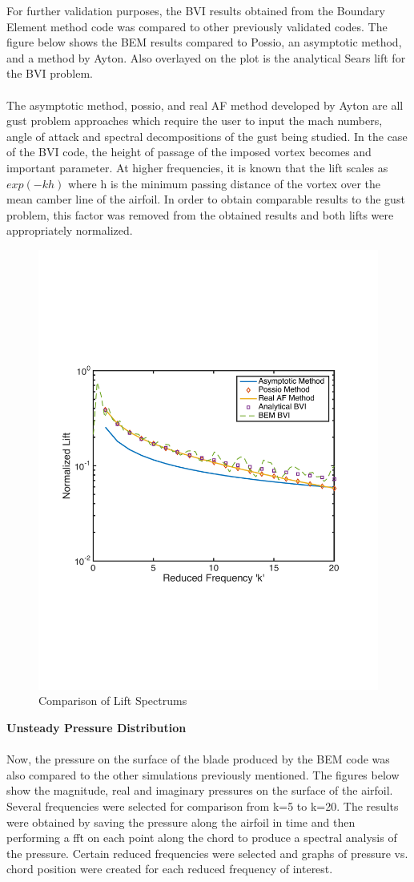 \documentclass{article}
\begin{document}
\noindent For further validation purposes, the BVI results obtained from the Boundary Element method code was compared to other previously validated codes. The figure below shows the BEM results compared to Possio, an asymptotic method, and a method by Ayton. Also overlayed on the plot is the analytical Sears lift for the BVI problem. \\ \\
The asymptotic method, possio, and real AF method developed by Ayton are all gust problem approaches which require the user to input the mach numbers, angle of attack and spectral decompositions of the gust being studied. In the case of the BVI code, the height of passage of the imposed vortex becomes and important parameter. At higher frequencies, it is known that the lift scales as $exp(-kh)$ where h is the minimum passing distance of the vortex over the mean camber line of the airfoil. In order to obtain comparable results to the gust problem, this factor was removed from the obtained results and both lifts were appropriately normalized.

\begin{figure}[h]
\includegraphics[width = 3.6 in, height = 2.5 in]{fp_total_compare}
\centering
\caption{Comparison of Lift Spectrums}
\end{figure}
\newpage
\noindent \textbf{Unsteady Pressure Distribution}\\ \\
\noindent Now, the pressure on the surface of the blade produced by the BEM code was also compared to the other simulations previously mentioned. The figures below show the magnitude, real and imaginary pressures on the surface of the airfoil. Several frequencies were selected for comparison from k=5 to k=20. The results were obtained by saving the pressure along the airfoil in time and then performing a fft on each point along the chord to produce a spectral analysis of the pressure. Certain reduced frequencies were selected and graphs of pressure vs. chord position were created for each reduced frequency of interest. \newline
\end{document}

